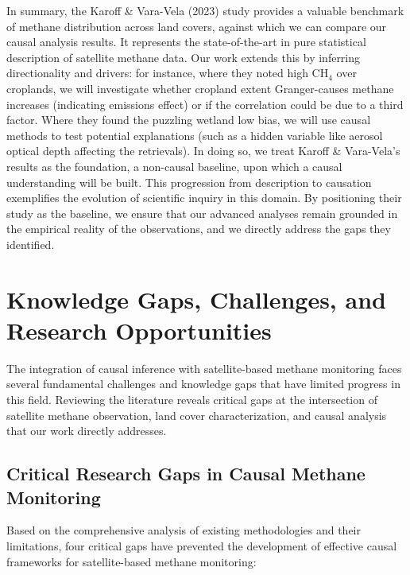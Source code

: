 In summary, the Karoff \& Vara-Vela (2023) study provides a valuable benchmark of methane distribution across land covers, against which we can compare our causal analysis results. It represents the state-of-the-art in pure statistical description of satellite methane data. Our work extends this by inferring directionality and drivers: for instance, where they noted high CH$_4$ over croplands, we will investigate whether cropland extent Granger-causes methane increases (indicating emissions effect) or if the correlation could be due to a third factor. Where they found the puzzling wetland low bias, we will use causal methods to test potential explanations (such as a hidden variable like aerosol optical depth affecting the retrievals). In doing so, we treat Karoff \& Vara-Vela's results as the foundation, a non-causal baseline, upon which a causal understanding will be built. This progression from description to causation exemplifies the evolution of scientific inquiry in this domain. By positioning their study as the baseline, we ensure that our advanced analyses remain grounded in the empirical reality of the observations, and we directly address the gaps they identified.

\section{Knowledge Gaps, Challenges, and Research Opportunities}
\label{sec:knowledge-gaps}

The integration of causal inference with satellite-based methane monitoring faces several fundamental challenges and knowledge gaps that have limited progress in this field. Reviewing the literature reveals critical gaps at the intersection of satellite methane observation, land cover characterization, and causal analysis that our work directly addresses.

\subsection{Critical Research Gaps in Causal Methane Monitoring}
\label{subsec:critical-research-gaps}

Based on the comprehensive analysis of existing methodologies and their limitations, four critical gaps have prevented the development of effective causal frameworks for satellite-based methane monitoring:

